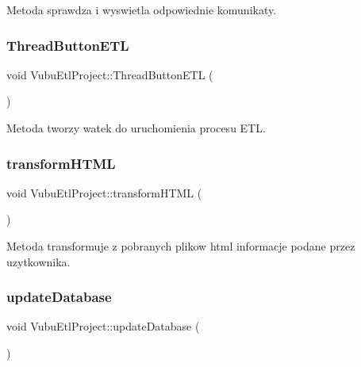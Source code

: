 Metoda sprawdza i wyswietla odpowiednie komunikaty. 

\mbox{\label{class_vubu_etl_project_a302013ec97cffed3af6caf652940c9ef}} 
\subsubsection{\texorpdfstring{Thread\+Button\+E\+TL}{ThreadButtonETL}}
{\footnotesize\ttfamily void Vubu\+Etl\+Project\+::\+Thread\+Button\+E\+TL (\begin{DoxyParamCaption}{ }\end{DoxyParamCaption})\hspace{0.3cm}{\ttfamily [slot]}}



Metoda tworzy watek do uruchomienia procesu E\+TL. 

\mbox{\label{class_vubu_etl_project_a96a0529f088b16f27bb5caf4613be354}} 
\subsubsection{\texorpdfstring{transform\+H\+T\+ML}{transformHTML}}
{\footnotesize\ttfamily void Vubu\+Etl\+Project\+::transform\+H\+T\+ML (\begin{DoxyParamCaption}{ }\end{DoxyParamCaption})\hspace{0.3cm}{\ttfamily [slot]}}



Metoda transformuje z pobranych plikow html informacje podane przez uzytkownika. 

\mbox{\label{class_vubu_etl_project_a3079e407acd405007d64fddf84b6f0e6}} 
\subsubsection{\texorpdfstring{update\+Database}{updateDatabase}}
{\footnotesize\ttfamily void Vubu\+Etl\+Project\+::update\+Database (\begin{DoxyParamCaption}{ }\end{DoxyParamCaption})\hspace{0.3cm}{\ttfamily [slot]}}




